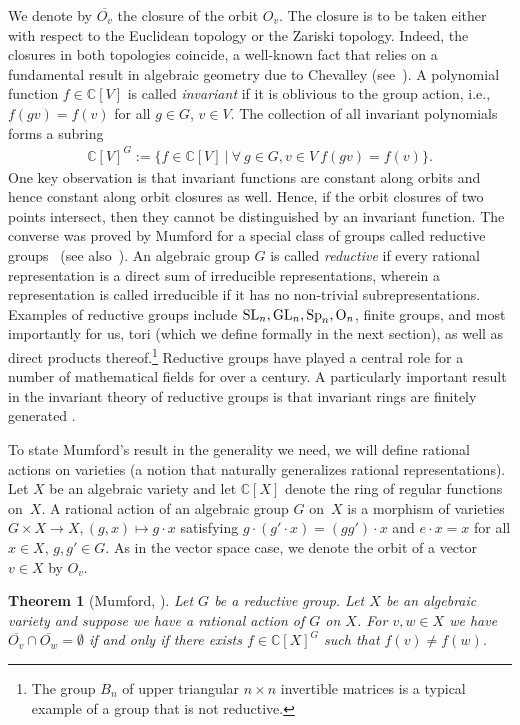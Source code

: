\documentclass[10pt,a4paper]{article}
\DeclareMathOperator{\GL}{GL}
\DeclareMathOperator{\SL}{SL}
\newtheorem{theorem}{Theorem}[section]
\theoremstyle{definition}
\numberwithin{equation}{section}
\newcommand{\CC}{\mathbb{C}}
\begin{document}
We denote by $\overline{O_v}$ the closure of the orbit $O_v$.
The closure is to be taken either with respect to the Euclidean topology or the Zariski topology.
Indeed, the closures in both topologies coincide, a well-known fact that relies on a fundamental result in algebraic geometry due to Chevalley (see~\cite[I.\S10]{mumford:88}).
A polynomial function $f \in \CC[V]$ is called \emph{invariant} if it is oblivious to the group action, i.e., $f(gv) = f(v)$ for all $g \in G$, $v \in V$.
%
The collection of all invariant polynomials forms a subring
\begin{align*}
  \CC[V]^G := \{f \in \CC[V]\ |\ \forall\ g\in G, v \in V\ f(gv) = f(v) \}.
\end{align*}
One key observation is that invariant functions are constant along orbits and hence constant along orbit closures as well.
Hence, if the orbit closures of two points intersect, then they cannot be distinguished by an invariant function.
The converse was proved by Mumford for a special class of groups called reductive groups~\cite{Mumford-book} (see also~\cite[Corollary~2.3.8]{DK}).
An algebraic group $G$ is called {\em reductive} if every rational representation is a direct sum of irreducible representations,
wherein a representation is called irreducible if it has no non-trivial subrepresentations.
Examples of reductive groups include $\SL_n, \GL_n, {\rm Sp}_n, {\rm O}_n$, finite groups, and most importantly for us, tori (which we define formally in the next section),
as well as direct products thereof.\footnote{The group $B_n$ of upper triangular $n \times n$ invertible matrices is a typical example of a group that is not reductive.}
Reductive groups have played a central role for a number of mathematical fields for over a century. A particularly important result in the invariant theory of reductive groups is that invariant rings are finitely generated \cite{Hilb1, Hilb2,weyl:39}.

To state Mumford's result in the generality we need, we will define rational actions on varieties (a notion that naturally generalizes rational representations).
Let $X$ be an algebraic variety and let $\CC[X]$ denote the ring of regular functions on~$X$.
A rational action of an algebraic group $G$ on~$X$ is a morphism of varieties $G \times X \rightarrow X, (g,x) \mapsto g\cdot x$ satisfying $g \cdot (g' \cdot x) = (gg') \cdot x$ and $e \cdot x = x$ for all $x \in X$, $g,g' \in G$.
As in the vector space case, we denote the orbit of a vector~$v\in X$ by $O_v$.

\begin{theorem}[Mumford, \cite{Mumford-book}]\label{thm:Mumford}
Let $G$ be a reductive group. Let $X$ be an algebraic variety and suppose we have a rational action of $G$ on $X$. For $v,w \in X$ we have
$\overline{O_v} \cap \overline{O_w} = \emptyset$ if and only if there exists $f \in \CC[X]^G$ such that $f(v) \neq f(w)$.
\end{theorem}
\end{document}
